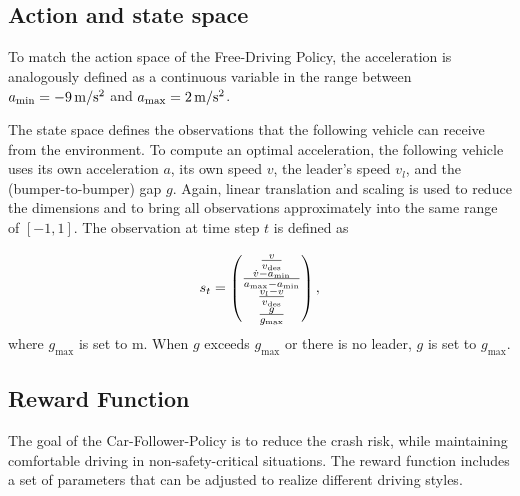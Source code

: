 \documentclass[review]{elsarticle}
\providecommand{\sub}[1]{_{\mathrm{#1}}}  %
\providecommand{\3}{{\ss}}
\begin{document}
\subsection{Action and state space}
\label{actionSpace1}
To match the action space of the Free-Driving Policy, the acceleration is analogously defined as a continuous variable in the range between $a\sub{\rm min} = \unit[-9]{m/s^2}$ and 
$a\sub{\rm max} =\unit[2]{m/s^2}$.


The state space defines the observations that the following
vehicle can receive from the environment. To compute an optimal
acceleration, the following vehicle uses its own acceleration $a$,
its own speed $v$, the leader's speed $v_l$,
and the (bumper-to-bumper) gap $g$.
 Again, linear translation and scaling is used
to reduce the dimensions and to bring all observations approximately
into the same range of $[-1,1]$. The observation at time step $t$ is defined as

\begin{equation}
s_t = 
\begin{pmatrix} 
\frac{v}{v\sub{des}} \\ 
\frac{\dot{v}-a\sub{\rm min}}{a\sub{\rm max} - a\sub{\rm min}}\\
\frac{v_l-v}{v\sub{des}}\\
\frac{g}{g\sub{\rm max}}

\end{pmatrix},
\end{equation}
%
where $g\sub{max}$ is set to  \unit[200]{m}. When $g$ exceeds  $g\sub{max}$ or there is no leader, $g$ is set to  $g\sub{max}$.

\subsection{Reward Function}
\label{rewardFunction}
The goal of the Car-Follower-Policy is to reduce the crash risk, while
maintaining comfortable driving in non-safety-critical situations. The
reward function includes a set of parameters that can be
adjusted to realize different driving styles. 
\end{document}

